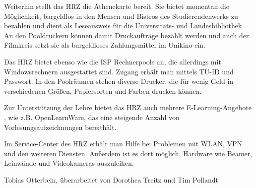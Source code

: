 {    Weiterhin stellt das HRZ die Athenekarte \footnotemark[13] bereit. Sie bietet momentan die Möglichkeit, bargeldlos in den Mensen und Bistros des Studierendenwerks zu bezahlen und dient als Leseausweis für die Universitäts- und Landesbibliothek. An den Pooldruckern können damit Druckaufträge bezahlt werden und auch der Filmkreis setzt sie als bargeldloses Zahlungsmittel im Unikino ein.

    Das HRZ bietet ebenso wie die ISP Rechnerpools an, die allerdings mit Windowsrechnern ausgestattet sind. Zugang erhält man mittels TU-ID und Passwort. In den Poolräumen stehen diverse Drucker, die für wenig Geld in verschiedenen Größen, Papiersorten und Farben drucken können.

    Zur Unterstützung der Lehre bietet das HRZ auch mehrere E-Learning-Angebote \footnotemark[14], wie z.B. OpenLearnWare, das eine steigende Anzahl von Vorlesungsaufzeichnungen bereithält.

    Im Service-Center des HRZ \footnotemark[15] erhält man Hilfe bei Problemen mit WLAN, VPN und den weiteren Diensten. Außerdem ist es dort möglich, Hardware wie Beamer, Leinwände und Videokameras auszuleihen.
}
{Tobias Otterbein, überarbeitet von Dorothea Treitz und Tim Pollandt}


\newpage
